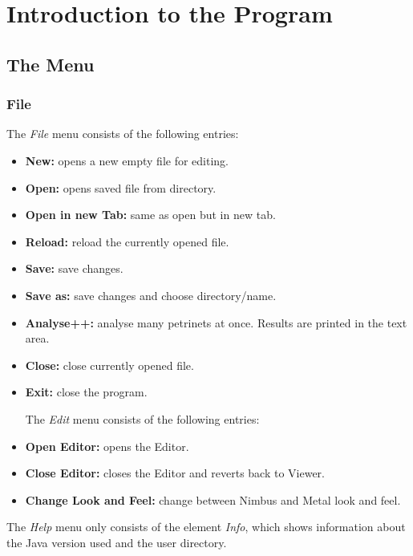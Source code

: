 \documentclass[10pt, a4paper]{article}
\begin{document}
\section{Introduction to the Program}

\subsection{The Menu}

\subsubsection{File}

The \textit{File} menu consists of the following entries:

\begin{itemize}

\item \textbf{New:} opens a new empty file for editing. 
\item \textbf{Open:} opens saved file from directory.
\item \textbf{Open in new Tab:} same as open but in new tab.
\item \textbf{Reload:} reload the currently opened file.
\item \textbf{Save:} save changes.
\item \textbf{Save as:} save changes and choose directory/name.
\item \textbf{Analyse++:} analyse many petrinets at once. Results are printed in the text area.
\item \textbf{Close:} close currently opened file.
\item \textbf{Exit:} close the program.

The \textit{Edit} menu consists of the following entries:

\end{itemize}

\begin{itemize}
\item \textbf{Open Editor:} opens the Editor.
\item \textbf{Close Editor:} closes the Editor and reverts back to Viewer.
\item \textbf{Change Look and Feel:} change between Nimbus and Metal look and feel.
\end{itemize}

The \textit{Help} menu only consists of the element \textit{Info}, which shows information about the Java version used and the user directory.
\end{document}
